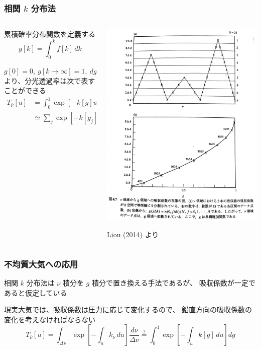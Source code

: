 \documentclass[unicode,colorlinks]{beamer}
\newcommand{\centeralign}[1]{\rule{0pt}{0pt}\hfill#1\hfill\rule{0pt}{0pt}}
\begin{document}
\begin{frame}
	\frametitle{相関 $k$ 分布法}
	\begin{columns}
		\begin{column}{0.55\textwidth}
			累積確率分布関数を定義する
			\[g[k]=\int^k_0 f[k]\,dk\]

			$g[0]=0,\ g[k\to\infty]=1,\ dg=f\,dk$ より、分光透過率は次で表すことができる
			\begin{align*}
				T_{\bar\nu}[u]&=\int^1_0 \exp[-k[g]u]\,dg\\
				&\simeq\sum_j\exp[-k[g_j]u]\,\Delta g_j
			\end{align*}
		\end{column}
		\begin{column}{0.45\textwidth}
			\centeralign{\includegraphics[width=\textwidth]{kbunpu.jpg}}
			\centeralign{\tiny Liou (2014) より}
		\end{column}
	\end{columns}
\end{frame}

\begin{frame}
	\frametitle{不均質大気への応用}
	相関 $k$ 分布法は $\nu$ 積分を $g$ 積分で置き換える手法であるが、
	吸収係数が一定であると仮定している

	現実大気では、吸収係数は圧力に応じて変化するので、
	鉛直方向の吸収係数の変化を考えなければならない
	\[
		T_{\bar\nu}[u]
		=\int_{\Delta\nu}\exp\left[-\int_u k_\nu\,du\right]\frac{d\nu}{\Delta\nu}
		\stackrel{?}{=}\int^1_0\exp\left[-\int_uk[g]\,du\right]dg
	\]
\end{frame}
\end{document}

